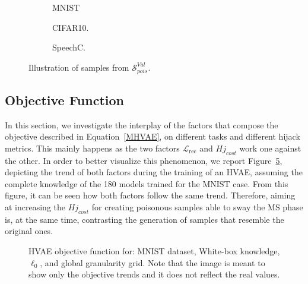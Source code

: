 \begin{figure}[!htpb]
  \centering
  \begin{subfigure}{0.225\linewidth}
     \centering
     
     \caption{MNIST}
     \label{subfig:7mnist}
  \end{subfigure}
  \hspace{0.05\linewidth}
  \begin{subfigure}{0.225\linewidth}
     \centering
     
     \caption{CIFAR10.}
     \label{subfig:7cifar}
  \end{subfigure}
  \hspace{0.05\linewidth}
  \begin{subfigure}{0.225\linewidth}
     \centering
     
     \caption{SpeechC.}
     \label{subfig:7sr}
  \end{subfigure}
  \caption{Illustration of samples from $\mathcal{S}^{Val}_{pois}$.}
  \label{fig:poison_samples}
\end{figure}
 
\subsection{Objective Function}
\label{subsec:objective}

In this section, we investigate the interplay of the factors that compose the objective described in Equation~\ref{MHVAE}, on different tasks and different hijack metrics. 
This mainly happens as the two factors $\mathcal{L}_{\mathrm{rec}}$ and $Hj_{cost}$ work one against the other.
In order to better visualize this phenomenon, we report Figure~\ref{HVAE_losses}, depicting the trend of both factors during the training of an HVAE, assuming the complete knowledge of the 180 models trained for the MNIST case.
From this figure, it can be seen how both factors follow
the same trend.
Therefore, aiming at increasing the $Hj_{cost}$ for creating poisonous samples able to sway the MS phase is, at the same time, contrasting the generation of samples that resemble the original ones.

\begin{figure}[!htbp]
    \centering
    
    \caption{HVAE objective function for: MNIST dataset, White-box knowledge, $\ell_0$, and global granularity grid. Note that the image is meant to show only the objective trends and it does not reflect the real values.}
    \label{HVAE_losses}
\end{figure}

